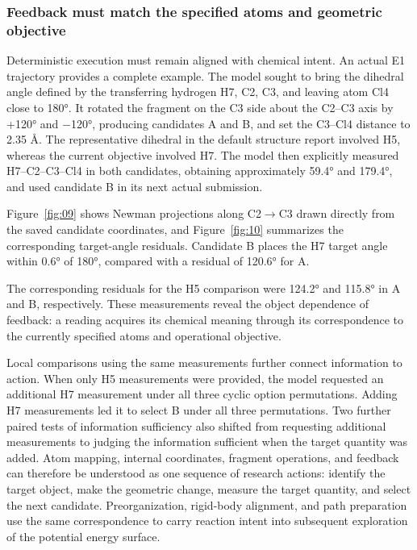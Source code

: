 \subsubsection{Feedback must match the specified atoms and geometric objective}



Deterministic execution must remain aligned with chemical intent. An actual E1 trajectory provides a complete example. The model sought to bring the dihedral angle defined by the transferring hydrogen H7, C2, C3, and leaving atom Cl4 close to 180°. It rotated the fragment on the C3 side about the C2–C3 axis by +120° and \( - \)120°, producing candidates A and B, and set the C3–Cl4 distance to 2.35 Å. The representative dihedral in the default structure report involved H5, whereas the current objective involved H7. The model then explicitly measured H7–C2–C3–Cl4 in both candidates, obtaining approximately 59.4° and 179.4°, and used candidate B in its next actual submission.

Figure~\ref{fig:09} shows Newman projections along C2\(\to\)C3 drawn directly from the saved candidate coordinates, and Figure~\ref{fig:10} summarizes the corresponding target-angle residuals. Candidate B places the H7 target angle within 0.6° of 180°, compared with a residual of 120.6° for A.

The corresponding residuals for the H5 comparison were 124.2° and 115.8° in A and B, respectively. These measurements reveal the object dependence of feedback: a reading acquires its chemical meaning through its correspondence to the currently specified atoms and operational objective.

Local comparisons using the same measurements further connect information to action. When only H5 measurements were provided, the model requested an additional H7 measurement under all three cyclic option permutations. Adding H7 measurements led it to select B under all three permutations. Two further paired tests of information sufficiency also shifted from requesting additional measurements to judging the information sufficient when the target quantity was added. Atom mapping, internal coordinates, fragment operations, and feedback can therefore be understood as one sequence of research actions: identify the target object, make the geometric change, measure the target quantity, and select the next candidate. Preorganization, rigid-body alignment, and path preparation use the same correspondence to carry reaction intent into subsequent exploration of the potential energy surface.





